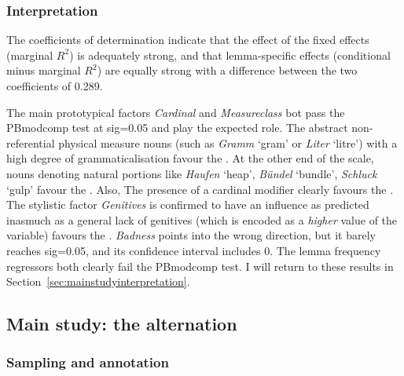 \subsubsection{Interpretation}

The coefficients of determination indicate that the effect of the fixed effects (marginal $R^2$) is adequately strong, and that lemma-specific effects (conditional minus marginal $R^2$) are equally strong with a difference between the two coefficients of 0.289.

The main prototypical factors \textit{Cardinal} and \textit{Measureclass} bot pass the PBmodcomp test at sig=0.05 and play the expected role.
The abstract non-referential physical measure nouns (such as \textit{Gramm} `gram' or \textit{Liter} `litre') with a high degree of grammaticalisation favour the \NACb.
At the other end of the scale, nouns denoting natural portions like \textit{Haufen} `heap', \textit{Bündel} `bundle', \textit{Schluck} `gulp' favour the \PGCd.
Also, The presence of a cardinal modifier clearly favours the \NACb.
The stylistic factor \textit{Genitives} is confirmed to have an influence as predicted inasmuch as a general lack of genitives (which is encoded as a \textit{higher} value of the variable) favours the \NACb.
\textit{Badness} points into the wrong direction, but it barely reaches sig=0.05, and its confidence interval includes 0.
The lemma frequency regressors both clearly fail the PBmodcomp test.
I will return to these results in Section~\ref{sec:mainstudyinterpretation}.

\subsection{Main study: the alternation}
\label{sec:annotation}
\label{sec:corpushierarchicalmodel}

\subsubsection{Sampling and annotation}
\label{sec:mainstudysampling}

